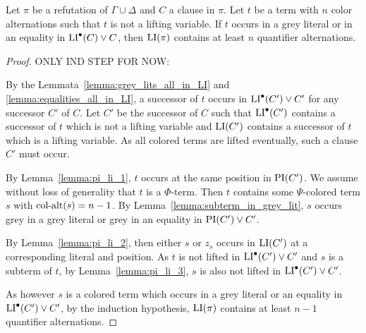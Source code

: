 \documentclass[%
	draft=false,%
	numbers=noendperiod,%
	11pt,%
	a4paper,%
	oneside,%
	openany,%
]{memoir}
\begin{document}
{
	\color{gray}
	\begin{clemma}
		Let $\pi$ be a refutation of $\Gamma \cup \Delta$ and $C$ a clause in $\pi$.
		Let $t$ be a term with $n$ color alternations such that $t$ is not a lifting variable.
		If $t$ occurs in a grey literal or in an equality in $\operatorname{LI}^\bullet(C) \lor C$, then $\operatorname{LI}(\pi)$ contains at least $n$ quantifier alternations.
	\end{clemma}
	\begin{proof}
		ONLY IND STEP FOR NOW: 


		By the Lemmata~\ref{lemma:grey_lits_all_in_LI} and \ref{lemma:equalities_all_in_LI}, a successor of $t$ occurs in $\operatorname{LI}^\bullet(C') \lor C'$ for any successor $C'$ of $C$.
		Let $C'$ be the successor of $C$ such that $\operatorname{LI}^\bullet(C')$ contains a successor of $t$ which is not a lifting variable and $\operatorname{LI}(C')$ contains a successor of $t$ which is a lifting variable.
		As all colored terms are lifted eventually, such a clause $C'$ must occur.


		By Lemma~\ref{lemma:pi_li_1}, $t$ occurs at the same position in $\operatorname{PI}(C')$.
		We assume without loss of generality that $t$ is a $\Phi$-term.
		Then $t$ contains some $\Psi$-colored term $s$ with $\operatorname{col-alt}(s) = n-1$.
		By Lemma~\ref{lemma:subterm_in_grey_lit}, $s$ occurs grey in a grey literal or grey in an equality in $\operatorname{PI}(C')\lor C'$.

		By Lemma~\ref{lemma:pi_li_2}, then either $s$ or $z_s$ occurs in $\operatorname{LI}(C')$  at a corresponding literal and position. 
		As $t$ is not lifted in $\operatorname{LI}^\bullet(C') \lor C'$ and $s$ is a subterm of $t$, by Lemma~\ref{lemma:pi_li_3}, $s$ is also not lifted in $\operatorname{LI}^\bullet(C') \lor C'$.

		As however $s$ is a colored term which occurs in a grey literal or an equality in $\operatorname{LI}^\bullet(C') \lor C'$, by the induction hypothesis, $\operatorname{LI}(\pi)$ contains at least $n-1$ quantifier alternations. 


	\end{proof}
}

\end{document}
